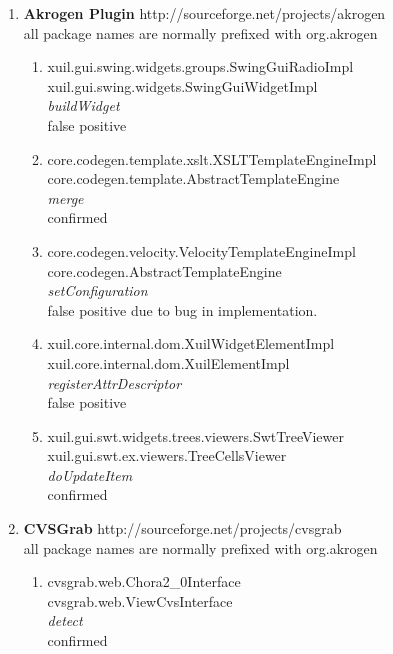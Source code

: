 \documentclass{acm_proc_article-sp}
\begin{document}
\begin{enumerate}
\item \textbf{Akrogen Plugin} http://sourceforge.net/projects/akrogen \\
  all package names are normally prefixed with org.akrogen
  \begin{enumerate}
  \item xuil.gui.swing.widgets.groups.SwingGuiRadioImpl \\
    xuil.gui.swing.widgets.SwingGuiWidgetImpl \\
    \emph{buildWidget}\\
    false positive
  
    \item core.codegen.template.xslt.XSLTTemplateEngineImpl \\    
    core.codegen.template.AbstractTemplateEngine \\
    \emph{merge}\\
    confirmed
    
    \item core.codegen.velocity.VelocityTemplateEngineImpl \\
    core.codegen.AbstractTemplateEngine\\
    \emph{setConfiguration}\\
    false positive due to bug in implementation.
    
    \item xuil.core.internal.dom.XuilWidgetElementImpl\\
    xuil.core.internal.dom.XuilElementImpl \\ 
    \emph{registerAttrDescriptor}\\
    false positive
    
    \item xuil.gui.swt.widgets.trees.viewers.SwtTreeViewer \\
    xuil.gui.swt.ex.viewers.TreeCellsViewer \\
    \emph{doUpdateItem}\\
    confirmed
  \end{enumerate}
  
\item \textbf{CVSGrab} http://sourceforge.net/projects/cvsgrab\\
  all package names are normally prefixed with org.akrogen
  \begin{enumerate}
    \item cvsgrab.web.Chora2\_0Interface \\
     cvsgrab.web.ViewCvsInterface \\
     \emph{detect}\\
     confirmed
     

\end{enumerate}
\end{enumerate}
\end{document}
